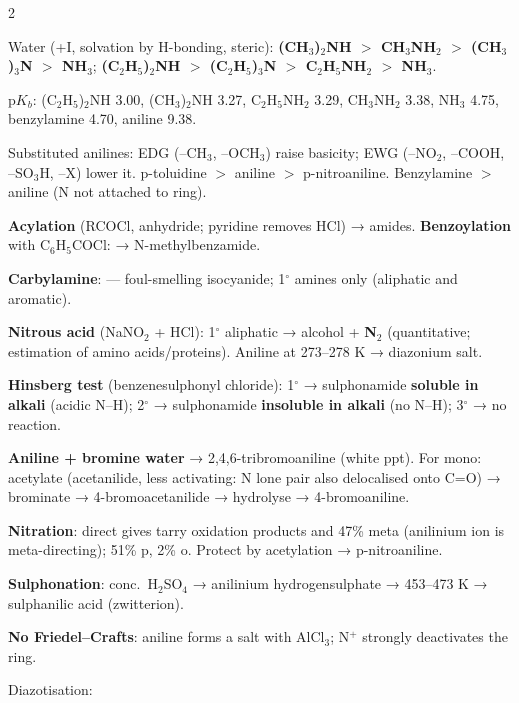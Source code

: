 \documentclass[9pt,a4paper]{extarticle}
\newcommand{\nr}[1]{\textbf{\color{uc!85!black}#1}}
\begin{document}
\begin{multicols}{2}
\begin{fl}
\item Water (+I, solvation by H-bonding, steric): \textbf{(CH$_3$)$_2$NH $>$ CH$_3$NH$_2$ $>$ (CH$_3$)$_3$N $>$ NH$_3$}; \textbf{(C$_2$H$_5$)$_2$NH $>$ (C$_2$H$_5$)$_3$N $>$ C$_2$H$_5$NH$_2$ $>$ NH$_3$}.
\item p$K_b$: (C$_2$H$_5$)$_2$NH 3.00, (CH$_3$)$_2$NH 3.27, C$_2$H$_5$NH$_2$ 3.29, CH$_3$NH$_2$ 3.38, NH$_3$ 4.75, benzylamine 4.70, aniline 9.38.
\item Substituted anilines: EDG (--CH$_3$, --OCH$_3$) raise basicity; EWG (--NO$_2$, --COOH, --SO$_3$H, --X) lower it. p-toluidine $>$ aniline $>$ p-nitroaniline. Benzylamine $>$ aniline (N not attached to ring).
\end{fl}
\begin{fl}
\item \textbf{Acylation} (RCOCl, anhydride; pyridine removes HCl) → amides. \textbf{Benzoylation} with C$_6$H$_5$COCl:  → N-methylbenzamide.
\item \nr{Carbylamine}:  — foul-smelling isocyanide; 1$^\circ$ amines only (aliphatic and aromatic).
\item \textbf{Nitrous acid} (NaNO$_2$ + HCl): 1$^\circ$ aliphatic → alcohol + \textbf{N$_2$} (quantitative; estimation of amino acids/proteins). Aniline at 273--278 K → diazonium salt.
\item \nr{Hinsberg test} (benzenesulphonyl chloride): 1$^\circ$ → sulphonamide \textbf{soluble in alkali} (acidic N--H); 2$^\circ$ → sulphonamide \textbf{insoluble in alkali} (no N--H); 3$^\circ$ → no reaction.
\item \textbf{Aniline + bromine water} → 2,4,6-tribromoaniline (white ppt). For mono: acetylate (acetanilide, less activating: N lone pair also delocalised onto C=O) → brominate → 4-bromoacetanilide → hydrolyse → 4-bromoaniline.
\item \textbf{Nitration}: direct gives tarry oxidation products and 47\% meta (anilinium ion is meta-directing); 51\% p, 2\% o. Protect by acetylation → p-nitroaniline.
\item \textbf{Sulphonation}: conc.\ H$_2$SO$_4$ → anilinium hydrogensulphate → 453--473 K → sulphanilic acid (zwitterion).
\item \textbf{No Friedel--Crafts}: aniline forms a salt with AlCl$_3$; N$^+$ strongly deactivates the ring.
\end{fl}
\begin{kbox}
Diazotisation: \\

\end{kbox}
\end{multicols}
\end{document}
